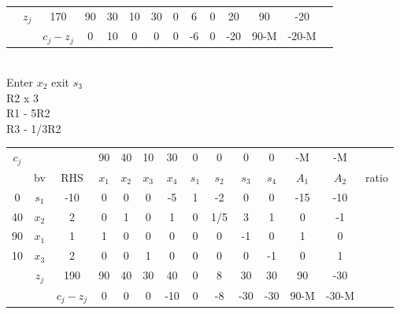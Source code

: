 \documentclass[answers]{exam}
\begin{document}
\begin{questions}
\begin{solution}
\begin{parts}
\begin{tabular}{cccccccccccccc}
		& \multicolumn{1}{c|}{$z_j$} & \multicolumn{1}{c|}{170}       & 90    & 30    & 10    & 30    & 0     & 6     & 0     & 20    & 90    & -20   &               \\ \cline{3-13}
		&                            & \multicolumn{1}{c|}{$c_j-z_j$} & 0     & 10    & 0     & 0     & 0     & -6    & 0     & -20   & 90-M  & -20-M &              
	\end{tabular} \\
	Enter $x_2$ exit $s_3$ \\
	R2 x 3 \\
	R1 - 5R2 \\
	R3 - 1/3R2 \\
	\begin{tabular}{cccccccccccccc}
		$c_j$                   &                            &                                & 90    & 40    & 10    & 30    & 0     & 0     & 0     & 0     & -M    & -M    &       \\
		\multicolumn{1}{c|}{}   & \multicolumn{1}{c|}{bv}    & \multicolumn{1}{c|}{RHS}       & $x_1$ & $x_2$ & $x_3$ & $x_4$ & $s_1$ & $s_2$ & $s_3$ & $s_4$ & $A_1$ & $A_2$ & ratio \\ \cline{1-13}
		\multicolumn{1}{c|}{0}  & \multicolumn{1}{c|}{$s_1$} & \multicolumn{1}{c|}{-10}       & 0     & 0     & 0     & -5    & 1     & -2    & 0     & 0     & -15   & -10   &       \\
		\multicolumn{1}{c|}{40} & \multicolumn{1}{c|}{$x_2$} & \multicolumn{1}{c|}{2}         & 0     & 1     & 0     & 1     & 0     & 1/5   & 3     & 1     & 0     & -1    &       \\
		\multicolumn{1}{c|}{90} & \multicolumn{1}{c|}{$x_1$} & \multicolumn{1}{c|}{1}         & 1     & 0     & 0     & 0     & 0     & 0     & -1    & 0     & 1     & 0     &       \\
		\multicolumn{1}{c|}{10} & \multicolumn{1}{c|}{$x_3$} & \multicolumn{1}{c|}{2}         & 0     & 0     & 1     & 0     & 0     & 0     & 0     & -1    & 0     & 1     &       \\ \cline{1-13}
		& \multicolumn{1}{c|}{$z_j$} & \multicolumn{1}{c|}{190}       & 90    & 40    & 30    & 40    & 0     & 8     & 30    & 30    & 90    & -30   &       \\ \cline{3-13}
		&                            & \multicolumn{1}{c|}{$c_j-z_j$} & 0     & 0     & 0     & -10   & 0     & -8    & -30   & -30   & 90-M  & -30-M &      
	\end{tabular} \\


\end{parts}
\end{solution}
\end{questions}
\end{document}

